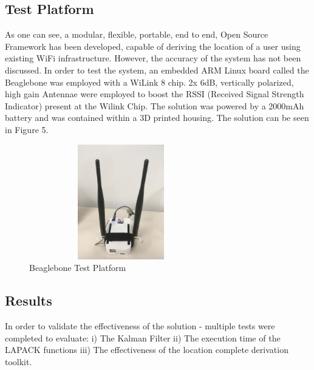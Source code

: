\documentclass[conference]{IEEEtran}
\begin{document}
\subsection{Test Platform}
As one can see, a modular, flexible, portable, end to end, Open Source Framework has been developed, capable of deriving the location of a user using existing WiFi infrastructure. However, the accuracy of the system has not been discussed. In order to test the system, an embedded ARM Linux board called the Beaglebone was employed with a WiLink 8 chip. 2x 6dB, vertically polarized, high gain Antennae were employed to boost the RSSI (Received Signal Strength Indicator) present at the Wilink Chip. The solution was powered by a 2000mAh battery and was contained within a 3D printed housing. The solution can be seen in Figure 5.
\begin{figure}[H]
    \includegraphics[width=8cm,height=5cm]{IMG_0796.JPG}
    \caption{Beaglebone Test Platform}
    \end{figure}

\subsection{Results}
In order to validate the effectiveness of the solution - multiple tests were completed to evaluate:\newline
i) The Kalman Filter \newline
ii) The execution time of the LAPACK functions\newline
iii) The effectiveness of the location complete derivation toolkit.
\end{document}
